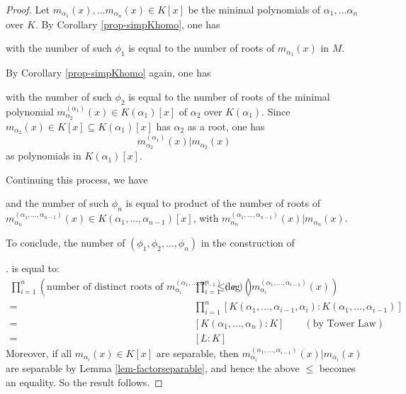\documentclass[11pt]{book}
\begin{document}
\begin{proof}
Let $m_{\alpha_1}(x), \dots m_{\alpha_n}(x) \in K[x]$ be the minimal polynomials of $\alpha_1, \dots \alpha_n$ over $K$. By Corollary \ref{prop-simpKhomo}, one has 
with the number of such $\phi_1$ is equal to the number of roots of $m_{\alpha_1}(x)$ in $M$.

By Corollary \ref{prop-simpKhomo} again, one has
with the number of such $\phi_2$ is equal to the number of roots of the minimal polynomial $m_{\alpha_2}^{(\alpha_1)}(x) \in K(\alpha_1)[x]$ of $\alpha_2$ over $K(\alpha_1)$. Since $m_{\alpha_2}(x) \in K[x] \subseteq K(\alpha_1)[x]$ has $\alpha_2$ as a root, one has
$$m_{\alpha_2}^{(\alpha_1)}(x) | m_{\alpha_2}(x)$$
as polynomials in $K(\alpha_1)[x]$.

Continuing this process, we have
\begin{center}
\end{center}
and the number of such $\phi_n$ is equal to product of the number of roots of $m_{\alpha_n}^{(\alpha_1, \dots, \alpha_{n-1})}(x) \in K(\alpha_1, \dots,  \alpha_{n-1})[x]$, with $m_{\alpha_n}^{(\alpha_1, \dots, \alpha_{n-1})}(x) | m_{\alpha_n}(x)$.

To conclude, the number of $(\phi_1, \phi_2, \dots, \phi_n)$ in the construction of
 .
is equal to:
\begin{align*}
\prod_{i=1}^n (\text{number of distinct roots of } m_{\alpha_i}^{(\alpha_1, \dots, \alpha_{i-1})}(x))
\leq\ &\prod_{i=1}^n \deg\left( m_{\alpha_i}^{(\alpha_1, \dots, \alpha_{i-1})}(x)\right)  \\
 =\ &\prod_{i=1}^n [K(\alpha_1, \ldots, \alpha_{i-1}, \alpha_i) : K(\alpha_1, \ldots, \alpha_{i-1})] \\
=\ &[K(\alpha_1, \ldots, \alpha_n):K] \quad \quad (\text{by Tower Law})\\
=\ &[L:K]
\end{align*}
 Moreover, if all $m_{\alpha_i}(x) \in K[x]$ are separable, then $m_{\alpha_i}^{(\alpha_1, \dots, \alpha_{i-1})}(x) | m_{\alpha_i}(x)$ are separable by Lemma \ref{lem-factorseparable}, and hence the above $\leq$ becomes an equality. So the result follows.
\end{proof}
\end{document}
